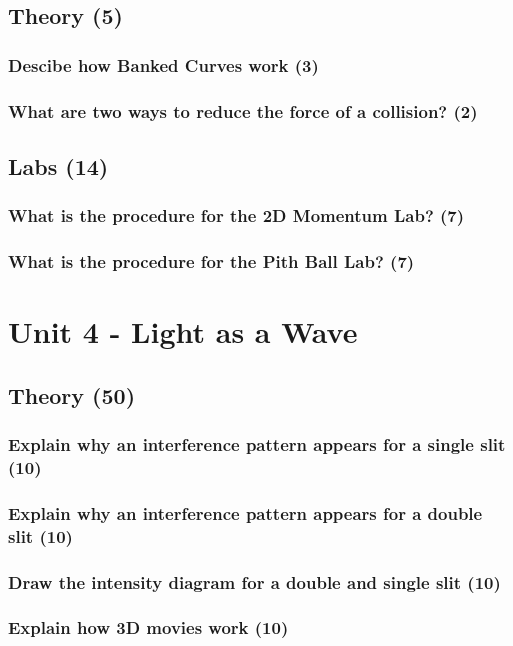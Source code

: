 \documentclass{article}
\begin{document}
\subsection{Theory (5)}
\subsubsection{Descibe how Banked Curves work (3)}
\subsubsection{What are two ways to reduce the force of a collision? (2)}

\subsection{Labs (14)}
\subsubsection{What is the procedure for the 2D Momentum Lab? (7)}
\subsubsection{What is the procedure for the Pith Ball Lab? (7)}



\section{Unit 4 - Light as a Wave}
\subsection{Theory (50)}
\subsubsection{Explain why an interference pattern appears for a single slit (10)}
\subsubsection{Explain why an interference pattern appears for a double slit (10)}
\subsubsection{Draw the intensity diagram for a double and single slit (10)}
\subsubsection{Explain how 3D movies work (10)}
\end{document}
